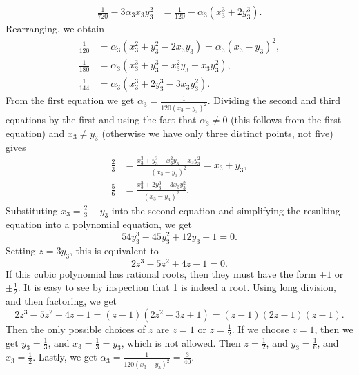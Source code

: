 \documentclass{homework}
\begin{document}
\begin{alphaparts}
\begin{align*}
			\frac{1}{720} - 3\alpha_3x_3y_3^2 &= \frac{1}{120} - \alpha_3(x_3^3+2y_3^3).
		\end{align*}
		Rearranging, we obtain
		\begin{align*}
			\frac{1}{120} &= \alpha_3(x_3^2 + y_3^2 -2x_3y_3) = \alpha_3(x_3-y_3)^2, \\
			\frac{1}{180} &= \alpha_3(x_3^3+ y_3^3-x_3^2y_3-x_3y_3^2), \\
			\frac{1}{144} &= \alpha_3(x_3^3 + 2y_3^3 - 3x_3y_3^2).
		\end{align*}
		From the first equation we get $\alpha_3 = \frac{1}{120(x_3-y_3)^2}$. Dividing the second and third equations by the first and using the fact that $\alpha_3\ne 0$ (this follows from the first equation) and $x_3 \ne y_3$ (otherwise we have only three distinct points, not five) gives
		\begin{align*}
			\frac{2}{3} &= \frac{x_3^3+y_3^3-x_3^2y_3-x_3y_3^2}{(x_3-y_3)^2} = x_3+y_3, \\
			\frac{5}{6} &= \frac{x_3^3+ 2y_3^3-3x_3y_3^2}{(x_3-y_3)^2}.
		\end{align*}
		Substituting $x_3 = \frac{2}{3} - y_3$ into the second equation and simplifying the resulting equation into a polynomial equation, we get
		\begin{equation*}
			54y_3^3-45y_3^2+12y_3-1=0.
		\end{equation*}
		Setting $z = 3y_3$, this is equivalent to
		\begin{equation*}
			2z^3-5z^2+4z-1 = 0.
		\end{equation*}
		If this cubic polynomial has rational roots, then they must have the form $\pm 1$ or $\pm \frac{1}{2}$. It is easy to see by inspection that 1 is indeed a root. Using long division, and then factoring, we get
		\begin{equation*}
			2z^3-5z^2+4z-1 = (z-1)(2z^2-3z+1) = (z-1)(2z-1)(z-1).
		\end{equation*}
		Then the only possible choices of $z$ are $z=1$ or $z = \frac{1}{2}$. If we choose $z = 1$, then we get $y_3 = \frac{1}{3}$, and $x_3 = \frac{1}{3}=y_3$, which is not allowed. Then $z = \frac{1}{2}$, and $y_3 = \frac{1}{6}$, and $x_3 = \frac{1}{2}$. Lastly, we get $\alpha_3 = \frac{1}{120(x_3-y_3)^2} = \frac{3}{40}$.
		

\end{alphaparts}
\end{document}
